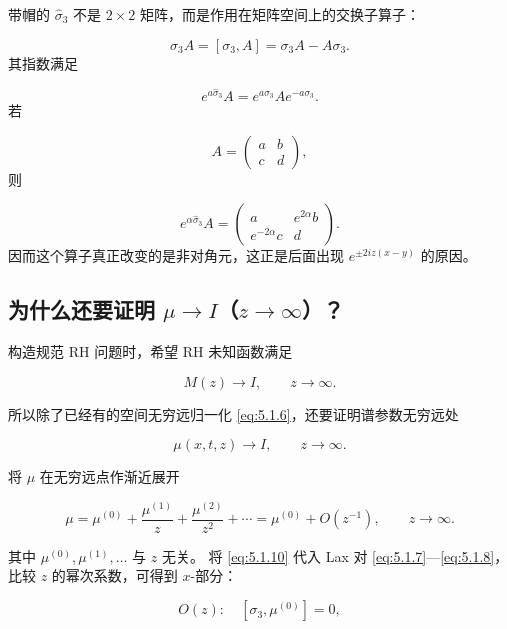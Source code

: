 \documentclass[
    lang=cn,
    scheme=chinese,
    mode=simple,
    device=normal,
    color=blue,
    math=cm,
    thmcnt=section,
    12pt,
    nowatermark
]{elegantbook}
\begin{document}
\begin{callout}
    带帽的 $\widehat{\sigma}_3$ 不是 $2\times2$ 矩阵，而是作用在矩阵空间上的交换子算子：

    \[
        \widehat{\sigma}_3A=[\sigma_3,A]=\sigma_3A-A\sigma_3.
    \]
    其指数满足

    \[
        e^{a\widehat{\sigma}_3}A
        =
        e^{a\sigma_3}Ae^{-a\sigma_3}.
    \]
    若

    \[
        A=\begin{pmatrix}a&b\\c&d\end{pmatrix},
    \]
    则

    \[
        e^{\alpha\widehat{\sigma}_3}A
        =
        \begin{pmatrix}
            a             & e^{2\alpha}b \\
            e^{-2\alpha}c & d
        \end{pmatrix}.
    \]
    因而这个算子真正改变的是非对角元，这正是后面出现 $e^{\pm2iz(x-y)}$ 的原因。
\end{callout}

\subsection{为什么还要证明 \texorpdfstring{$\mu\to I$}{μ → I}（\texorpdfstring{$z\to\infty$}{z → ∞}）？}

构造规范 RH 问题时，希望 RH 未知函数满足

\[
    M(z)\to I,\qquad z\to\infty.
\]

所以除了已经有的空间无穷远归一化 \eqref{eq:5.1.6}，还要证明谱参数无穷远处

\[
    \mu(x,t,z)\to I,\qquad z\to\infty.
\]

将 $\mu$ 在无穷远点作渐近展开

\begin{equation}
    \mu
    =
    \mu^{(0)}
    +\dfrac{\mu^{(1)}}{z}
    +\dfrac{\mu^{(2)}}{z^2}
    +\cdots
    =
    \mu^{(0)}+O(z^{-1}),
    \qquad z\to\infty.
    \tag{5.1.10}
    \label{eq:5.1.10}
\end{equation}

其中 $\mu^{(0)},\mu^{(1)},\ldots$ 与 $z$ 无关。
将 \eqref{eq:5.1.10} 代入 Lax 对 \eqref{eq:5.1.7}---\eqref{eq:5.1.8}，比较 $z$ 的幂次系数，可得到 $x$-部分：

\begin{equation}
    O(z):\quad[\sigma_3,\mu^{(0)}]=0,
    \tag{5.1.11}
    \label{eq:5.1.11}
\end{equation}
\end{document}
